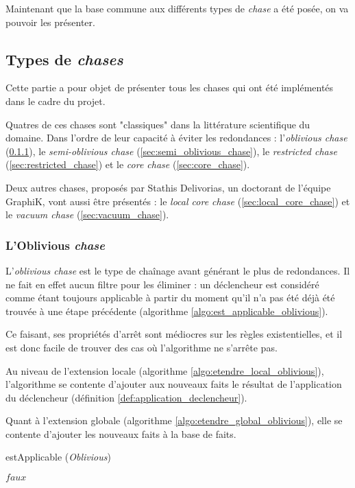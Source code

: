 Maintenant que la base commune aux différents types de \textit{chase} a été posée, on va pouvoir les présenter.

\subsection{Types de \textit{chases}}\label{subsec:types_chases}

Cette partie a pour objet de présenter tous les chases qui ont été implémentés dans le cadre du projet.
\par Quatres de ces chases sont "classiques" dans la littérature scientifique du domaine. Dans l'ordre de leur capacité à éviter les redondances : l'\textit{oblivious chase} (\ref{sec:oblivious_chase}), le \textit{semi-oblivious chase} (\ref{sec:semi_oblivious_chase}), le \textit{restricted chase} (\ref{sec:restricted_chase}) et le \textit{core chase} (\ref{sec:core_chase}). 
\par Deux autres chases, proposés par Stathis Delivorias, un doctorant de l'équipe GraphiK, vont aussi être présentés : le \textit{local core chase} (\ref{sec:local_core_chase}) et le \textit{vacuum chase} (\ref{sec:vacuum_chase}).

\subsubsection{L'Oblivious \textit{chase}}\label{sec:oblivious_chase}

L'\textit{oblivious chase} est le type de chaînage avant générant le plus de redondances. Il ne fait en effet aucun filtre pour les éliminer : un déclencheur est considéré comme étant toujours applicable à partir du moment qu'il n'a pas été déjà été trouvée à une étape précédente (algorithme \ref{algo:est_applicable_oblivious}).
\par Ce faisant, ses propriétés d'arrêt sont médiocres sur les règles existentielles, et il est donc facile de trouver des cas où l'algorithme ne s'arrête pas.
\par Au niveau de l'extension locale (algorithme \ref{algo:etendre_local_oblivious}), l'algorithme se contente d'ajouter aux nouveaux faits le résultat de l'application du déclencheur (définition \ref{def:application_declencheur}).
\par Quant à l'extension globale (algorithme \ref{algo:etendre_global_oblivious}), elle se contente d'ajouter les nouveaux faits à la base de faits.


\begin{algorithm}[H]\label{algo:est_applicable_oblivious}
\caption{estApplicable (\textit{Oblivious})}
\SetAlgoLined
\DontPrintSemicolon
{}
{
    \Return $faux$
}
\end{algorithm}

